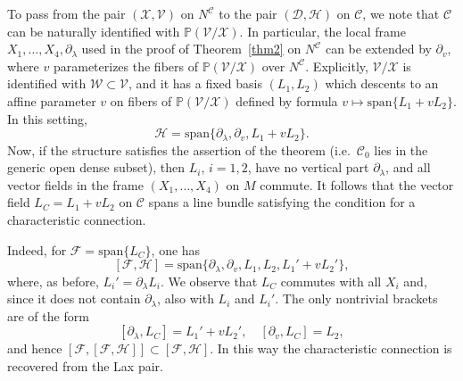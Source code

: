 \documentclass[11pt]{amsart}
\theoremstyle{definition}
\newcommand{\PP}{\mathbb{P}}
\newcommand{\spn}{\mathrm{span}}
\newcommand{\DD}{\mathcal{D}}
\newcommand{\VV}{\mathcal{V}}
\newcommand{\FF}{\mathcal{F}}
\newcommand{\WW}{\mathcal{W}}
\newcommand{\XX}{\mathcal{X}}
\newcommand{\HHH}{\mathcal{H}}
\newcommand{\CC}{\mathcal{C}}
\begin{document}
To pass from the pair $(\XX,\VV)$ on $N^\CC$ to the pair $(\DD,\HHH)$ on $\CC$, we note that $\CC$ can be naturally identified with $\PP(\VV/\XX)$. In particular, the local frame $X_1,\ldots,X_4,\partial_\lambda$ used in the proof of Theorem~\ref{thm2} on $N^\CC$ can be extended by $\partial_v$, where $v$ parameterizes the fibers of $\PP(\VV/\XX)$ over $N^\CC$. Explicitly, $\VV/\XX$ is identified with $\WW\subset \VV$, and it has a fixed basis $(L_1,L_2)$ which descents to an affine parameter $v$ on fibers of $\PP(\VV/\XX)$ defined by formula $v\mapsto \spn\{L_1+vL_2\}$. In this setting,
\[
\HHH = \spn\{\partial_\lambda,\partial_v,L_1 + vL_2\}.
\]
Now, if the structure satisfies the assertion of the theorem (i.e.\ $\CC_0$ lies in the generic open dense subset), then $L_i$, $i=1,2$, have no vertical part $\partial_\lambda$, and all vector fields in the frame $(X_1,\ldots,X_4)$ on $M$ commute. It follows that the vector field $L_C = L_1 + vL_2$ on $\CC$ spans a line bundle satisfying the condition for a characteristic connection.

Indeed, for $\FF = \spn\{L_C\}$, one has
\[
[\FF,\HHH] = \spn\{\partial_\lambda,\partial_v,L_1,L_2,L_1' + vL_2'\},
\]
where, as before, $L_i' = \partial_\lambda L_i$. We observe that $L_C$ commutes with all $X_i$ and, since it does not contain $\partial_\lambda$, also with $L_i$ and $L_i'$. The only nontrivial brackets are of the form
\[
[\partial_\lambda,L_C] = L_1' + vL_2',\quad [\partial_v,L_C]=L_2,
\]
and hence $[\FF,[\FF,\HHH]] \subset [\FF,\HHH]$. In this way the characteristic connection is recovered from the Lax pair.
\end{document}
